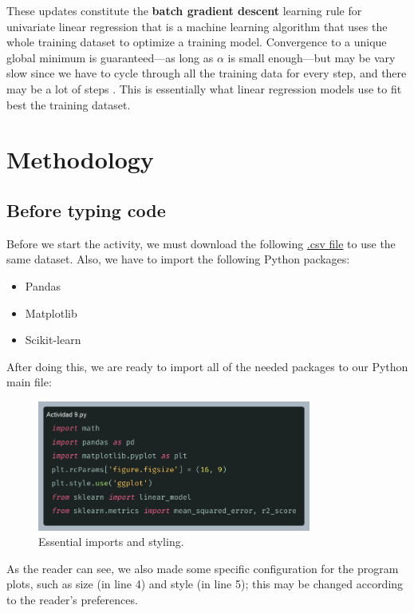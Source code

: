 \documentclass[10pt]{article}
\begin{document}
These updates constitute the \textbf{batch gradient descent} learning rule for univariate linear regression \cite{ai} that is a machine learning algorithm that uses the whole training dataset to optimize a training model. Convergence to a unique global minimum is guaranteed---as long as $\alpha$ is small enough---but may be vary slow since we have to cycle through all the training data for every step, and there may be a lot of steps \cite{ai}. This is essentially what linear regression models use to fit best the training dataset.

\newpage

\section{Methodology}
\subsection{Before typing code}
Before we start the activity, we must download the following \href{http://www.aprendemachinelearning.com/articulos_ml/}{.csv file} \cite{aprendeML} to use the same dataset. Also, we have to import the following Python packages:
\begin{itemize}
  \item Pandas
  \item Matplotlib
  \item Scikit-learn
\end{itemize}
After doing this, we are ready to import all of the needed packages to our Python main file: \par

\begin{figure}[h]
  \centering
  \includegraphics[width=90mm]{2025-03-26-14-16-48.png}
  \caption{Essential imports and styling.}
\end{figure}

As the reader can see, we also made some specific configuration for the program plots, such as size (in line 4) and style (in line 5); this may be changed according to the reader's preferences.
\end{document}
